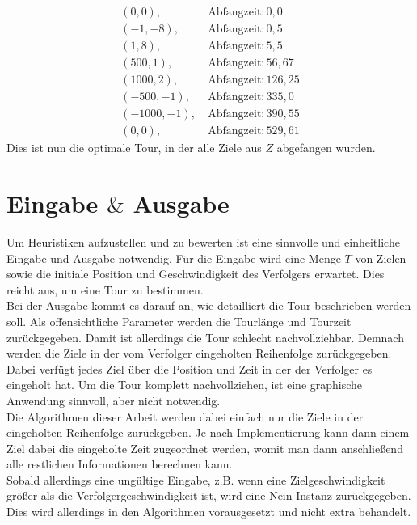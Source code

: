 \documentclass[german,version-2019-11]{uzl-thesis}
\begin{document}
\begin{example}
\begin{align*}
(0, 0),~ &\text{Abfangzeit}: 0,0 \\
(-1, -8),~ &\text{Abfangzeit}: 0,5 \\
(1, 8),~ &\text{Abfangzeit}: 5,5 \\
(500, 1),~ &\text{Abfangzeit}: 56,67 \\
(1000, 2),~ &\text{Abfangzeit}: 126,25 \\
(-500, -1),~ &\text{Abfangzeit}: 335,0 \\
(-1000, -1),~ &\text{Abfangzeit}: 390,55 \\
(0, 0),~ &\text{Abfangzeit}: 529,61
\end{align*}
Dies ist nun die optimale Tour, in der alle Ziele aus $Z$ abgefangen wurden.

\end{example}

\section{Eingabe $\&$ Ausgabe}

Um Heuristiken aufzustellen und zu bewerten ist eine sinnvolle und einheitliche Eingabe und Ausgabe notwendig. Für die Eingabe wird eine Menge $T$ von Zielen sowie die initiale Position und Geschwindigkeit des Verfolgers erwartet. Dies reicht aus, um eine Tour zu bestimmen. \\
Bei der Ausgabe kommt es darauf an, wie detailliert die Tour beschrieben werden soll. Als offensichtliche Parameter werden die Tourlänge und Tourzeit zurückgegeben. Damit ist allerdings die Tour schlecht nachvollziehbar. Demnach werden die Ziele in der vom Verfolger eingeholten Reihenfolge zurückgegeben. Dabei verfügt jedes Ziel über die Position und Zeit in der der Verfolger es eingeholt hat. Um die Tour komplett nachvollziehen, ist eine graphische Anwendung sinnvoll, aber nicht notwendig. \\
Die Algorithmen dieser Arbeit werden dabei einfach nur die Ziele in der eingeholten Reihenfolge zurückgeben. Je nach Implementierung kann dann einem Ziel dabei die eingeholte Zeit zugeordnet werden, womit man dann anschließend alle restlichen Informationen berechnen kann. \\
Sobald allerdings eine ungültige Eingabe, z.B. wenn eine Zielgeschwindigkeit größer als die Verfolgergeschwindigkeit ist, wird eine \glqq Nein\grqq-Instanz zurückgegeben. Dies wird allerdings in den Algorithmen vorausgesetzt und nicht extra behandelt. 
\end{document}

